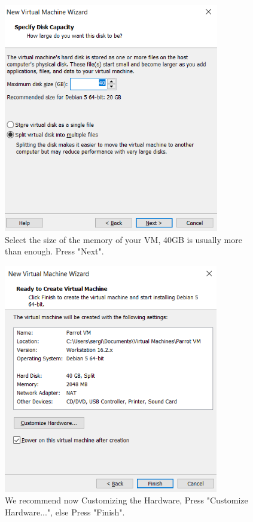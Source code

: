 \documentclass[a4paper]{article}
\begin{document}
    \vfill

    \begin{figure}[h!]
        \centering
        \includegraphics[height=10cm, keepaspectratio]{Images/Create_VM/Creating_VM_4.png}
        \caption{Select the size of the memory of your VM, 40GB is usually more than enough. Press "Next".}
    \end{figure}

    \clearpage
    \begin{figure}[h]
        \centering
        \includegraphics[height=10cm, keepaspectratio]{Images/Create_VM/Creating_VM_5.png}
        \caption{We recommend now Customizing the Hardware, Press "Customize Hardware...", else Press "Finish".}
    \end{figure}
\end{document}
